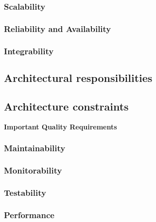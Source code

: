 \documentclass[a4paper,12pt,titlepage]{article}
\begin{document}
		\subsubsection{Scalability}
			
			
		\subsubsection{Reliability and Availability}
			
			
		\subsubsection{Integrability}
			
	\subsection{Architectural responsibilities}
	\subsection{Architecture constraints}	



\textbf{\LARGE Important Quality Requirements}
			
		\subsubsection{Maintainability}
			
			
		\subsubsection{Monitorability}
			
			
		\subsubsection{Testability}
			
			
		\subsubsection{Performance}
\end{document}

